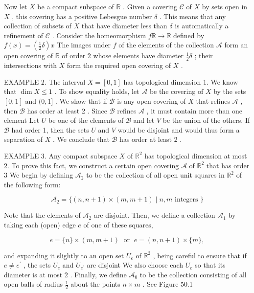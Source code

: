 Now let \(X\) be a compact subspace of \(\mathbb{R}\) . Given a covering \(\mathcal{C}\) of \(X\) by sets open in \(X\) , this covering has a positive Lebesgue number \(\delta\) . This means that any collection of subsets of \(X\) that have diameter less than \(\delta\) is automatically a refinement of \(\mathcal{C}\) . Consider the homeomorphism \(f\mathbb{R} \rightarrow  \mathbb{R}\) defined by \(f\left( x\right)  = \left( {\frac{1}{2}\delta }\right) x\) The images under \(f\) of the elements of the collection \(\mathcal{A}\) form an open covering of \(\mathbb{R}\) of order 2 whose elements have diameter \(\frac{1}{2}\delta\) ; their intersections with \(X\) form the required open covering of \(X\) .

EXAMPLE 2. The interval \(X = \left\lbrack  {0,1}\right\rbrack\) has topological dimension 1. We know that \(\dim X \leq  1\) . To show equality holds, let \(\mathcal{A}\) be the covering of \(X\) by the sets \(\left\lbrack  {0,1}\right\rbrack\) and \((0,1\rbrack\) . We show that if \(\mathcal{B}\) is any open covering of \(X\) that refines \(\mathcal{A}\) , then \(\mathcal{B}\) has order at least 2 . Since \(\mathcal{B}\) refines \(\mathcal{A}\) , it must contain more than one element Let \(U\) be one of the elements of \(\mathcal{B}\) and let \(V\) be the union of the others. If \(\mathcal{B}\) had order 1, then the sets \(U\) and \(V\) would be disjoint and would thus form a separation of \(X\) . We conclude that \(\mathcal{B}\) has order at least 2 .

EXAMPLE 3. Any compact subspace \(X\) of \({\mathbb{R}}^{2}\) has topological dimension at most 2. To prove this fact, we construct a certain open covering \(\mathcal{A}\) of \({\mathbb{R}}^{2}\) that has order 3 We begin by defining \({\mathcal{A}}_{2}\) to be the collection of all open unit squares in \({\mathbb{R}}^{2}\) of the following form:

\[
{\mathcal{A}}_{2} = \{ \left( {n,n + 1}\right)  \times  \left( {m,m + 1}\right)  \mid  n,m\text{ integers }\}
\]

Note that the elements of \({\mathcal{A}}_{2}\) are disjoint. Then, we define a collection \({\mathcal{A}}_{1}\) by taking each (open) edge \(e\) of one of these squares,

\[
e = \{ n\}  \times  \left( {m,m + 1}\right) \;\text{ or }\;e = \left( {n,n + 1}\right)  \times  \{ m\} ,
\]

and expanding it slightly to an open set \({U}_{e}\) of \({\mathbb{R}}^{2}\) , being careful to ensure that if \(e \neq  {e}^{\prime }\) , the sets \({U}_{e}\) and \({U}_{{e}^{\prime }}\) are disjoint We also choose each \({U}_{e}\) so that its diameter is at most 2 . Finally, we define \({\mathcal{A}}_{0}\) to be the collection consisting of all open balls of radius \(\frac{1}{2}\) about the points \(n \times  m\) . See Figure 50.1

